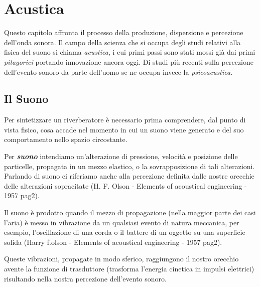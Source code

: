
\chapter{Acustica}
\label{chp:Acustica}

Questo capitolo affronta il processo della produzione, dispersione e percezione dell'onda sonora. Il campo della scienza che si occupa degli studi relativi alla fisica del suono si chiama \emph{acustica}, i cui primi passi sono stati mossi già dai primi \textit{pitagorici} portando innovazione ancora oggi. Di studi più recenti sulla percezione dell'evento sonoro da parte dell'uomo se ne occupa invece la \textit{psicoacustica}.  

\section{Il Suono}
Per sintetizzare un riverberatore è necessario prima comprendere, dal punto di vista fisico, cosa accade nel momento in cui un suono viene generato e del suo comportamento nello spazio circostante.

Per \textbf{\textit{suono}} intendiamo un'alterazione di pressione, velocità e posizione delle particelle, propagata in un mezzo elastico, o la sovrapposizione di tali alterazioni.
Parlando di suono ci riferiamo anche alla percezione definita dalle nostre orecchie delle alterazioni sopracitate (H. F. Olson - Elements of acoustical engineering - 1957 pag2).

Il suono è prodotto quando il mezzo di propagazione (nella maggior parte dei casi l'aria)
è messo in vibrazione da un qualsiasi evento di natura meccanica, per esempio, l'oscillazione di una corda o il battere di un oggetto su una superficie solida  (Harry f.olson - Elements of acoustical engineering - 1957 pag2).

Queste vibrazioni, propagate in modo sferico, raggiungono il nostro orecchio avente la funzione di trasduttore (trasforma l'energia cinetica in impulsi elettrici) risultando nella nostra percezione dell'evento sonoro.
